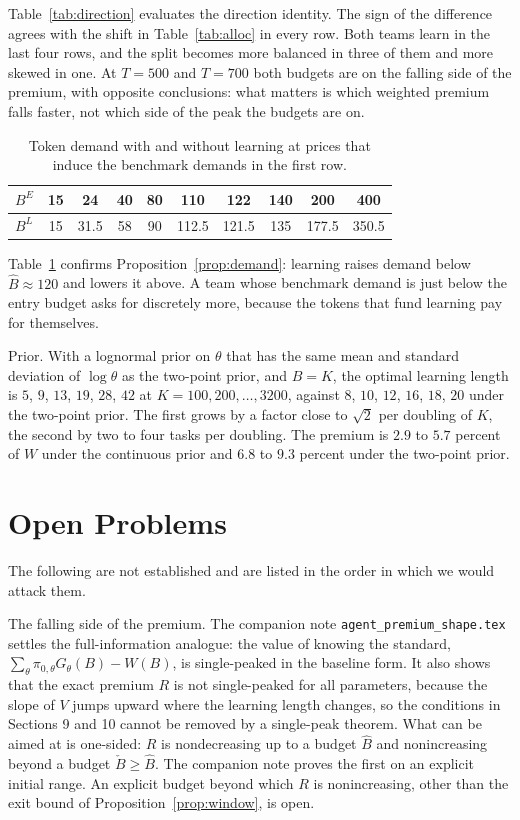 \documentclass[11pt]{article}
\theoremstyle{definition}
\begin{document}
Table~\ref{tab:direction} evaluates the direction identity. The sign of the difference agrees with the shift in Table~\ref{tab:alloc} in every row. Both teams learn in the last four rows, and the split becomes more balanced in three of them and more skewed in one. At $T=500$ and $T=700$ both budgets are on the falling side of the premium, with opposite conclusions: what matters is which weighted premium falls faster, not which side of the peak the budgets are on.

\begin{table}[htbp]
\centering
\small
\setlength{\tabcolsep}{5pt}
\begin{tabular}{@{}lccccccccc@{}}
\toprule
$B^E$ & 15 & 24 & 40 & 80 & 110 & 122 & 140 & 200 & 400 \\
\midrule
$B^L$ & 15 & 31.5 & 58 & 90 & 112.5 & 121.5 & 135 & 177.5 & 350.5 \\
\bottomrule
\end{tabular}
\caption{Token demand with and without learning at prices that induce the benchmark demands in the first row.}
\label{tab:demand}
\end{table}

Table~\ref{tab:demand} confirms Proposition~\ref{prop:demand}: learning raises demand below $\hat B\approx120$ and lowers it above. A team whose benchmark demand is just below the entry budget asks for discretely more, because the tokens that fund learning pay for themselves.

Prior. With a lognormal prior on $\theta$ that has the same mean and standard deviation of $\log\theta$ as the two-point prior, and $B=K$, the optimal learning length is $5$, $9$, $13$, $19$, $28$, $42$ at $K=100,200,\dots,3200$, against $8$, $10$, $12$, $16$, $18$, $20$ under the two-point prior. The first grows by a factor close to $\sqrt2$ per doubling of $K$, the second by two to four tasks per doubling. The premium is $2.9$ to $5.7$ percent of $W$ under the continuous prior and $6.8$ to $9.3$ percent under the two-point prior.

\section{Open Problems}\label{sec:open}

The following are not established and are listed in the order in which we would attack them.

The falling side of the premium. The companion note \texttt{agent\_premium\_shape.tex} settles the full-information analogue: the value of knowing the standard, $\sum_\theta\pi_{0,\theta}G_\theta(B)-W(B)$, is single-peaked in the baseline form. It also shows that the exact premium $R$ is not single-peaked for all parameters, because the slope of $V$ jumps upward where the learning length changes, so the conditions in Sections 9 and 10 cannot be removed by a single-peak theorem. What can be aimed at is one-sided: $R$ is nondecreasing up to a budget $\hat B$ and nonincreasing beyond a budget $\check B\ge\hat B$. The companion note proves the first on an explicit initial range. An explicit budget beyond which $R$ is nonincreasing, other than the exit bound of Proposition~\ref{prop:window}, is open.
\end{document}
